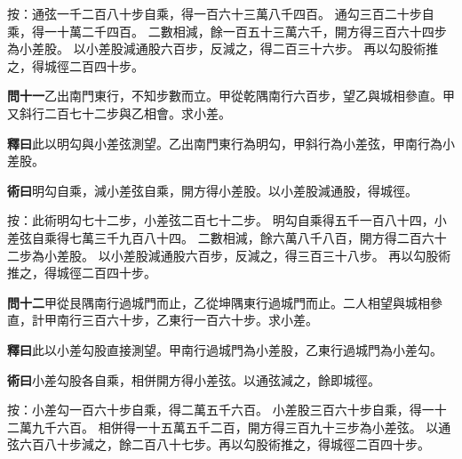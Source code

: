 \documentclass[12pt,a4paper]{article}
\begin{document}
\vspace{0.3em}

\noindent
按：通弦一千二百八十步自乘，得一百六十三萬八千四百。
通勾三百二十步自乘，得一十萬二千四百。
二數相減，餘一百五十三萬六千，開方得三百六十四步為小差股。
以小差股減通股六百步，反減之，得二百三十六步。
再以勾股術推之，得城徑二百四十步。

\vspace{0.5em}

\noindent\textbf{問十一}\quad 乙出南門東行，不知步數而立。甲從乾隅南行六百步，望乙與城相參直。甲又斜行二百七十二步與乙相會。求小差。

\vspace{0.3em}

\noindent\textbf{釋曰}\quad 此以明勾與小差弦測望。乙出南門東行為明勾，甲斜行為小差弦，甲南行為小差股。

\vspace{0.3em}

\noindent\textbf{術曰}\quad 明勾自乘，減小差弦自乘，開方得小差股。以小差股減通股，得城徑。

\vspace{0.3em}

\noindent
按：此術明勾七十二步，小差弦二百七十二步。
明勾自乘得五千一百八十四，小差弦自乘得七萬三千九百八十四。
二數相減，餘六萬八千八百，開方得二百六十二步為小差股。
以小差股減通股六百步，反減之，得三百三十八步。
再以勾股術推之，得城徑二百四十步。

\vspace{0.5em}

\noindent\textbf{問十二}\quad 甲從艮隅南行過城門而止，乙從坤隅東行過城門而止。二人相望與城相參直，計甲南行三百六十步，乙東行一百六十步。求小差。

\vspace{0.3em}

\noindent\textbf{釋曰}\quad 此以小差勾股直接測望。甲南行過城門為小差股，乙東行過城門為小差勾。

\vspace{0.3em}

\noindent\textbf{術曰}\quad 小差勾股各自乘，相併開方得小差弦。以通弦減之，餘即城徑。

\vspace{0.3em}

\noindent
按：小差勾一百六十步自乘，得二萬五千六百。
小差股三百六十步自乘，得一十二萬九千六百。
相併得一十五萬五千二百，開方得三百九十三步為小差弦。
以通弦六百八十步減之，餘二百八十七步。再以勾股術推之，得城徑二百四十步。

\vspace{0.5em}
\end{document}
